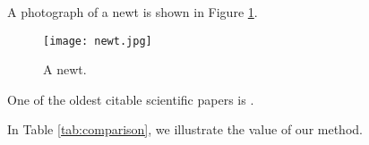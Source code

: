 A photograph of a newt is shown in Figure \ref{fig:newt}.
\begin{figure}[!h]
    \texttt{[image: newt.jpg]}
    \caption{A newt.}
    \label{fig:newt}
\end{figure}

One of the oldest citable scientific papers is \cite{van1677concerning}.


In Table \ref{tab:comparison}, we illustrate the value of our method.
